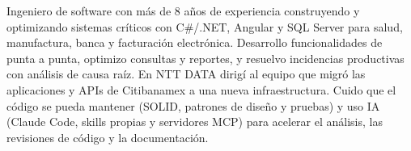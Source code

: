 Ingeniero de software con más de 8 años de experiencia construyendo y optimizando sistemas críticos con C\#/.NET, Angular y SQL Server para salud, manufactura, banca y facturación electrónica. Desarrollo funcionalidades de punta a punta, optimizo consultas y reportes, y resuelvo incidencias productivas con análisis de causa raíz. En NTT DATA dirigí al equipo que migró las aplicaciones y APIs de Citibanamex a una nueva infraestructura. Cuido que el código se pueda mantener (SOLID, patrones de diseño y pruebas) y uso IA (Claude Code, skills propias y servidores MCP) para acelerar el análisis, las revisiones de código y la documentación.
